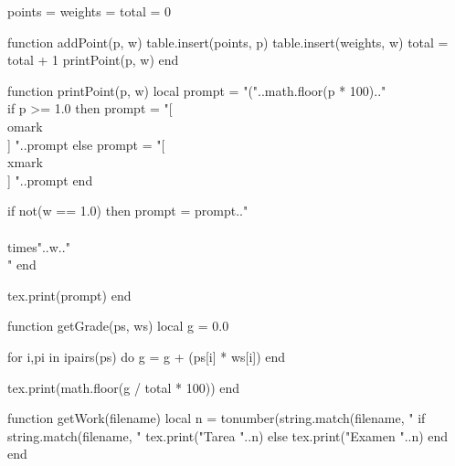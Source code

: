 \usepackage[a4paper, top=2cm]{geometry}
\usepackage[spanish,mexico]{babel}
\usepackage[dvipsnames]{xcolor}
\usepackage{xfp}
\usepackage{pifont}
\usepackage{luacode}
\usepackage{pdfpages}
\usepackage{amsmath,enumerate}


\newcommand{\omark}{{\color{OliveGreen}\ding{52}}}
\newcommand{\xmark}{{\color{Bittersweet}\ding{56}}}
\newcommand{\point}[2][1.0]{\item\textbf{\directlua{addPoint(#2, #1)}} }
\newcommand{\grade}{\directlua{getGrade(points, weights)} }
\newcommand{\work}{\directlua{getWork('t02-cimas-navarro-calificacion')} }
\newcommand{\fullname}{\directlua{getFullname('t02-cimas-navarro-calificacion')} }

\begin{luacode*}

    points = {}
    weights = {}
    total = 0

    function addPoint(p, w)
        table.insert(points, p)
        table.insert(weights, w)
        total = total + 1
        printPoint(p, w)
    end

    function printPoint(p, w)
        local prompt = "("..math.floor(p * 100).."\\%

        if p >= 1.0 then
            prompt = "[ \\omark \\ ] "..prompt
        else
            prompt = "[ \\xmark \\ ] "..prompt
        end

        if not(w == 1.0) then
            prompt = prompt.." \\{\\times"..w.."\\}"
        end

        tex.print(prompt)
    end

    function getGrade(ps, ws)
        local g = 0.0

        for i,pi in ipairs(ps) do
            g = g + (ps[i] * ws[i])
        end

        tex.print(math.floor(g / total * 100))
    end

    function getWork(filename)
        local n = tonumber(string.match(filename, "%
        if string.match(filename, "%
            tex.print("Tarea "..n)
        else
            tex.print("Examen "..n)
        end
    end


\end{luacode*}

